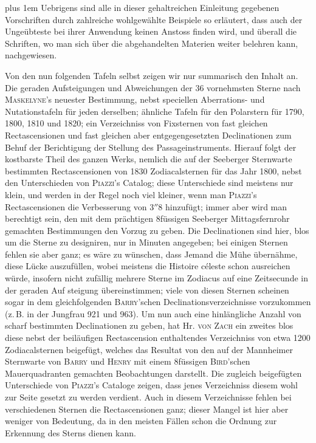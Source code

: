 \begingroup\rightskip=0pt plus 1em
Uebrigens sind alle in dieser gehaltreichen Einleitung gegebenen Vorschriften durch zahlreiche wohlgewählte Beispiele so erläutert, dass auch der Ungeübteste bei ihrer Anwendung keinen Anstoss finden wird, und überall die Schriften, wo man sich über die abgehandelten Materien weiter belehren kann, nachgewiesen.\par\endgroup

Von den nun folgenden Tafeln selbst zeigen wir nur summarisch den Inhalt an. Die geraden Aufsteigungen und Abweichungen der 36 vornehmsten Sterne nach \textsc{Maskelyne}'s neuester Bestimmung, nebst speciellen Aberrations- und Nutationstafeln für jeden derselben; ähnliche Tafeln für den Polarstern für 1790, 1800, 1810 und 1820; ein Verzeichniss von Fixsternen von fast gleichen Rectascensionen und fast gleichen aber entgegengesetzten Declinationen zum Behuf der Berichtigung der Stellung des Passageinstruments. Hierauf folgt der kostbarste Theil des ganzen Werks, nemlich die auf der Seeberger Sternwarte bestimmten Rectascensionen von 1830 Zodiacalsternen für das Jahr 1800, nebst den Unterschieden von \textsc{Piazzi}'s Catalog; diese Unterschiede sind meistens nur klein, und werden in der Regel noch viel kleiner, wenn man \textsc{Piazzi}'s Rectascensionen die Verbesserung von $3''8$ hinzufügt; immer aber wird man berechtigt sein, den mit dem prächtigen 8füssigen Seeberger Mittagsfernrohr gemachten Bestimmungen den Vorzug zu geben. Die Declinationen sind hier, blos um die Sterne zu designiren, nur in Minuten angegeben; bei einigen Sternen fehlen sie aber ganz; es wäre zu wünschen, dass Jemand die Mühe übernähme, diese Lücke auszufüllen, wobei meistens die Histoire céleste schon ausreichen würde, insofern nicht zufällig mehrere Sterne im Zodiacus auf eine Zeitsecunde in der geraden Auf%
%
steigung übereinstimmen; viele von diesen Sternen scheinen sogar in dem gleichfolgenden \textsc{Barry}'schen Declinationsverzeichnisse vorzukommen (z.\,B. in der Jungfrau 921 und 963). Um nun auch eine hinlängliche Anzahl von scharf bestimmten Declinationen zu geben, hat Hr. \textsc{von Zach} ein zweites blos diese nebst der beiläufigen Rectascension enthaltendes Verzeichniss von etwa 1200 Zodiacalsternen beigefügt, welches das Resultat von den auf der Mannheimer Sternwarte von \textsc{Barry} und \textsc{Henry} mit einem 8füssigen \textsc{Bird}'schen Mauerquadranten gemachten Beobachtungen darstellt. Die zugleich beigefügten Unterschiede von \textsc{Piazzi}'s Cataloge zeigen, dass jenes Verzeichniss diesem wohl zur Seite gesetzt zu werden verdient. Auch in diesem Verzeichnisse fehlen bei verschiedenen Sternen die Rectascensionen ganz; dieser Mangel ist hier aber weniger von Bedeutung, da in den meisten Fällen schon die Ordnung zur Erkennung des Sterns dienen kann.

